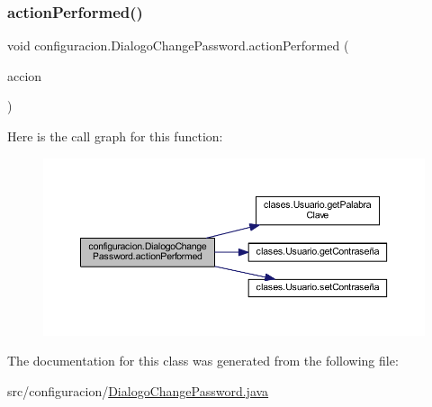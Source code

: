 \subsubsection{\texorpdfstring{action\+Performed()}{actionPerformed()}}
{\footnotesize\ttfamily void configuracion.\+Dialogo\+Change\+Password.\+action\+Performed (\begin{DoxyParamCaption}\item[{Action\+Event}]{accion }\end{DoxyParamCaption})}

Here is the call graph for this function\+:
\nopagebreak
\begin{figure}[H]
\begin{center}
\leavevmode
\includegraphics[width=350pt]{classconfiguracion_1_1_dialogo_change_password_a085982d24548bfce1e2d1e7dd3465f34_cgraph}
\end{center}
\end{figure}


The documentation for this class was generated from the following file\+:\begin{DoxyCompactItemize}
\item 
src/configuracion/\mbox{\hyperlink{_dialogo_change_password_8java}{Dialogo\+Change\+Password.\+java}}\end{DoxyCompactItemize}
